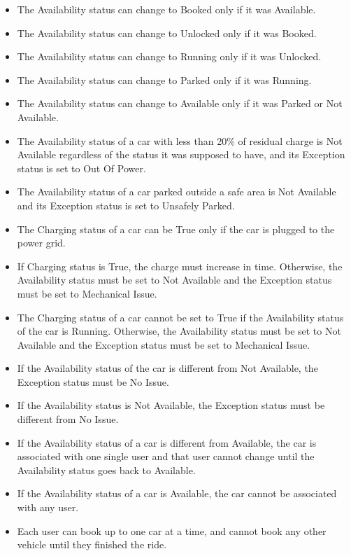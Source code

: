 \documentclass[11pt]{article} %
\begin{document}
\begin{itemize}
	\item The Availability status can change to Booked only if it was Available.
	\item The Availability status can change to Unlocked only if it was Booked.
	\item The Availability status can change to Running only if it was Unlocked.
	\item The Availability status can change to Parked only if it was Running.
	\item  The Availability status can change to Available only if it was Parked or Not Available.
	\item The Availability status of a car with less than 20\% of residual charge is Not Available regardless of the status it was supposed to have, and its Exception status is set to Out Of Power.
	\item The Availability status of a car parked outside a safe area is Not Available and its Exception status is set to Unsafely Parked.
	\item The Charging status of a car can be True only if the car is plugged to the power grid.
	\item If Charging status is True, the charge must increase in time. Otherwise, the Availability status must be set to Not Available and the Exception status must be set to Mechanical Issue. 
	\item The Charging status of a car cannot be set to True if the Availability status of the car is Running. Otherwise, the Availability status must be set to Not Available and the Exception status must be set to Mechanical Issue. 
	\item If the Availability status of the car is different from Not Available, the Exception status must be No Issue.
	\item If the Availability status is Not Available, the Exception status must be different from No Issue.
	\item If the Availability status of a car is different from Available, the car is associated with one single user and that user cannot change until the Availability status goes back to Available.
	\item If the Availability status of a car is Available, the car cannot be associated with any user.
	\item Each user can book up to one car at a time, and cannot book any other vehicle until they finished the ride.
\end{itemize}
	
\end{document}
